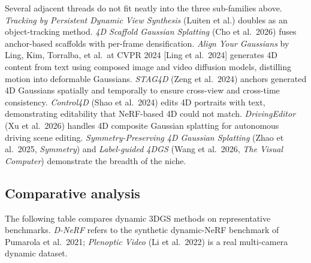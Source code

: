 Several adjacent threads do not fit neatly into the three sub-families above. \emph{Tracking by Persistent Dynamic View Synthesis} (Luiten et al.) doubles as an object-tracking method. \emph{4D Scaffold Gaussian Splatting} (Cho et al.~2026) fuses anchor-based scaffolds with per-frame densification. \emph{Align Your Gaussians} by Ling, Kim, Torralba, et al.~at CVPR 2024 {[}Ling et al.~2024{]} generates 4D content from text using composed image and video diffusion models, distilling motion into deformable Gaussians. \emph{STAG4D} (Zeng et al.~2024) anchors generated 4D Gaussians spatially and temporally to ensure cross-view and cross-time consistency. \emph{Control4D} (Shao et al.~2024) edits 4D portraits with text, demonstrating editability that NeRF-based 4D could not match. \emph{DrivingEditor} (Xu et al.~2026) handles 4D composite Gaussian splatting for autonomous driving scene editing. \emph{Symmetry-Preserving 4D Gaussian Splatting} (Zhao et al.~2025, \emph{Symmetry}) and \emph{Label-guided 4DGS} (Wang et al.~2026, \emph{The Visual Computer}) demonstrate the breadth of the niche.

\subsection{Comparative analysis}\label{comparative-analysis}

The following table compares dynamic 3DGS methods on representative benchmarks. \emph{D-NeRF} refers to the synthetic dynamic-NeRF benchmark of Pumarola et al.~2021; \emph{Plenoptic Video} (Li et al.~2022) is a real multi-camera dynamic dataset.

